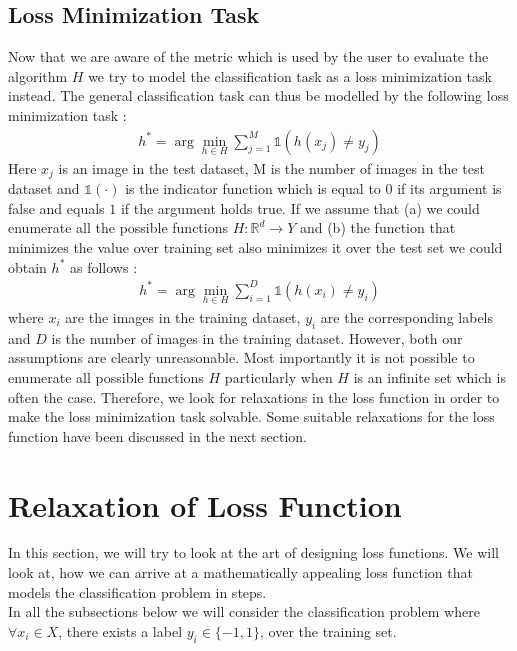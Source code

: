 \documentclass[12pt]{article}
\begin{document}
\subsection{Loss Minimization Task}
Now that we are aware of the metric which is used by the user to evaluate the algorithm $H$ we try to model the classification task as a loss minimization task instead. The general classification task can thus be modelled by the following loss minimization task :\\
\begin{align*}
    h^{*} = \arg \min_{h \in H}\sum_{j=1}^{M}\mathds{1}(h(x_j) \neq y_j)
\end{align*}
Here $x_j$ is an image in the test dataset, M is the number of images in the test dataset and $\mathds{1}(\cdot)$ is the indicator function which is equal to $0$ if its argument is false and equals $1$ if the argument holds true. If we assume that (a) we could enumerate all the possible functions $H : \mathbb{R}^d \rightarrow Y$ and (b) the function that minimizes the value over training set also minimizes it over the test set we could obtain $h^{*}$ as follows :
\begin{align*}
    h^{*} = \arg \min_{h \in H}\sum_{i=1}^{D}\mathds{1}(h(x_i) \neq y_i)
\end{align*}
where $x_i$ are the images in the training dataset, $y_i$ are the corresponding labels and $D$ is the number of images in the training dataset. However, both our assumptions are clearly unreasonable. Most importantly it is not possible to enumerate all possible functions $H$ particularly when $H$ is an infinite set which is often the case. Therefore, we look for relaxations in the loss function in order to make the loss minimization task solvable. Some suitable relaxations for the loss function have been discussed in the next section.
\section{Relaxation of Loss Function}
In this section, we will try to look at the art of designing loss functions. We will look at, how we can arrive at a mathematically appealing loss function that models the classification problem in steps.\\
In all the subsections below we will consider the classification problem where $\forall x_i \in X$, there exists a label $y_i \in \{-1,1\}$, over the training set.
\end{document}
